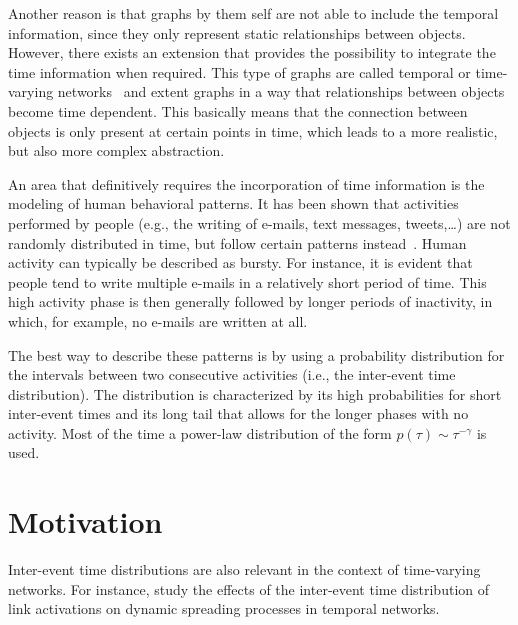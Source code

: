 Another reason is that graphs by them self are not able to include the temporal information, since they only represent static relationships between objects.
However, there exists an extension that provides the possibility to integrate the time information when required.
This type of graphs are called temporal or time-varying networks~\cite{Holme2012, Holme2015} and extent graphs in a way that relationships between objects become time dependent.
This basically means that the connection between objects is only present at certain points in time, which leads to a more realistic, but also more complex abstraction.

An area that definitively requires the incorporation of time information is the modeling of human behavioral patterns.
It has been shown that activities performed by people (e.g., the writing of e-mails, text messages, tweets,\ldots) are not randomly distributed in time, but follow certain patterns instead~\cite{Barabasi2005}.
Human activity can typically be described as bursty.
For instance, it is evident that people tend to write multiple e-mails in a relatively short period of time.
This high activity phase is then generally followed by longer periods of inactivity, in which, for example, no e-mails are written at all.

The best way to describe these patterns is by using a probability distribution for the intervals between two consecutive activities (i.e., the inter-event time distribution).
The distribution is characterized by its high probabilities for short inter-event times and its long tail that allows for the longer phases with no activity.
Most of the time a power-law distribution of the form \( p(\tau) \sim \tau^{-\gamma} \) is used.




\section{Motivation}
\label{sec:motivation}

Inter-event time distributions are also relevant in the context of time-varying networks.
For instance, \citet{Lambiotte2013} study the effects of the inter-event time distribution of link activations on dynamic spreading processes in temporal networks.

